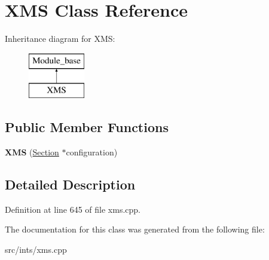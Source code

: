 \hypertarget{classXMS}{\section{X\-M\-S Class Reference}
\label{classXMS}
}
Inheritance diagram for X\-M\-S\-:\begin{figure}[H]
\begin{center}
\leavevmode
\includegraphics[height=2.000000cm]{classXMS}
\end{center}
\end{figure}
\subsection*{Public Member Functions}
\begin{DoxyCompactItemize}
\item 
\hypertarget{classXMS_a09c1f705bac7231151e025c1444f8c2c}{{\bfseries X\-M\-S} (\hyperlink{classSection}{Section} $\ast$configuration)}\label{classXMS_a09c1f705bac7231151e025c1444f8c2c}

\end{DoxyCompactItemize}


\subsection{Detailed Description}


Definition at line 645 of file xms.\-cpp.



The documentation for this class was generated from the following file\-:\begin{DoxyCompactItemize}
\item 
src/ints/xms.\-cpp\end{DoxyCompactItemize}
